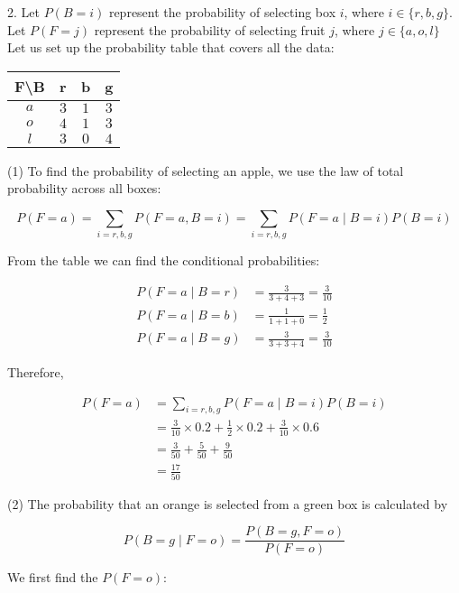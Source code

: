2. Let $P(B = i)$ represent the probability of selecting box $i$, where $i \in \{ r, b, g\}$.
Let $P(F = j)$ represent the probability of selecting fruit $j$, where $j \in \{ a, o, l \}$
Let us set up the probability table that covers all the data:

\begin{table}[h]
    \centering
    \begin{tabular}{ c | c  c  c }
        \hline
        F\backslash B & r   & b   & g   \\
        \hline
        $a$           & $3$ & $1$ & $3$ \\
        $o$           & $4$ & $1$ & $3$ \\
        $l$           & $3$ & $0$ & $4$ \\
        \hline
    \end{tabular}
    \label{tab:q2}
\end{table}

(1) To find the probability of selecting an apple, we use the law of total probability across all boxes:

\[
    P(F = a) = \sum_{i = r, b, g}{P(F = a, B = i)} = \sum_{i = r, b, g}{P(F = a \mid B = i)P(B = i)}
\]

From the table we can find the conditional probabilities:

\begin{align*}
    P(F = a \mid B = r) &= \frac{3}{3 + 4 + 3} = \frac{3}{10} \\
    P(F = a \mid B = b) &= \frac{1}{1 + 1 + 0} = \frac{1}{2} \\
    P(F = a \mid B = g) &= \frac{3}{3 + 3 + 4} = \frac{3}{10}
\end{align*}

Therefore,

\begin{align*}
    P(F = a)
    &= \sum_{i = r, b, g}{P(F = a \mid B = i)P(B = i)} \\
    &= \frac{3}{10} \times 0.2 + \frac{1}{2} \times 0.2 + \frac{3}{10} \times 0.6 \\
    &= \frac{3}{50} + \frac{5}{50} + \frac{9}{50} \\
    &= \frac{17}{50}
\end{align*}

(2) The probability that an orange is selected from a green box is calculated by

\[
    P(B = g \mid F = o)
    = \frac{P(B = g, F = o)}{P(F = o)}
\]

We first find the $P(F = o)$:

